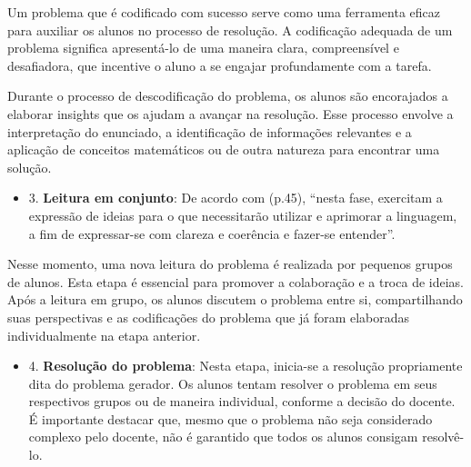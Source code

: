 Um problema que é codificado com sucesso serve como uma ferramenta eficaz para auxiliar os alunos no processo de resolução. A codificação adequada de um problema significa apresentá-lo de uma maneira clara, compreensível e desafiadora, que incentive o aluno a se engajar profundamente com a tarefa.

Durante o processo de descodificação do problema, os alunos são encorajados a elaborar insights que os ajudam a avançar na resolução. Esse processo envolve a interpretação do enunciado, a identificação de informações relevantes e a aplicação de conceitos matemáticos ou de outra natureza para encontrar uma solução.


\begin{itemize}
    \item 3. \textbf{Leitura em conjunto}: De acordo com  (p.45), ``nesta fase, exercitam a expressão de ideias para o que necessitarão utilizar e aprimorar a linguagem, a fim de expressar-se com clareza e coerência e fazer-se entender''.
\end{itemize}

Nesse momento, uma nova leitura do problema é realizada por pequenos grupos de alunos. Esta etapa é essencial para promover a colaboração e a troca de ideias. Após a leitura em grupo, os alunos discutem o problema entre si, compartilhando suas perspectivas e as codificações do problema que já foram elaboradas individualmente na etapa anterior.


\begin{itemize}
    \item 4. \textbf{Resolução do problema}: Nesta etapa, inicia-se a resolução propriamente dita do problema gerador. Os alunos tentam resolver o problema em seus respectivos grupos ou de maneira individual, conforme a decisão do docente. É importante destacar que, mesmo que o problema não seja considerado complexo pelo docente, não é garantido que todos os alunos consigam resolvê-lo.
\end{itemize}

